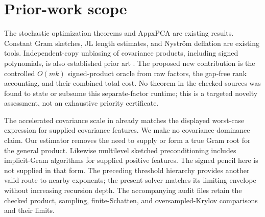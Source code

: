\documentclass[11pt]{article}
\begin{document}
\section{Prior-work scope}
The stochastic optimization theorems \cite{garber,frostig} and
AppxPCA \cite{lazysvd} are existing results. Constant Gram sketches,
JL length estimates, and Nystr\"om deflation are existing tools.
Independent-copy unbiasing of covariance products, including signed
polynomials, is also established prior art \cite{lijordan,gemp}.
The proposed new contribution is the controlled \(O(mk)\)
signed-product oracle from raw factors, the gap-free rank accounting,
and their combined total cost. No theorem in the checked sources was
found to state or subsume this separate-factor runtime; this is a
targeted novelty assessment, not an exhaustive priority certificate.

The accelerated covariance scale in \cite{garber} already matches
the displayed worst-case expression for supplied covariance features.
We make no covariance-dominance claim. Our estimator removes the
need to supply or form a true Gram root for the general product.
Likewise multilevel sketched preconditioning \cite{msp} includes
implicit-Gram algorithms for supplied positive features.
The signed pencil here is not supplied in that form.
The preceding threshold hierarchy \cite{thresholdnote} provides
another valid route to nearby exponents; the present solver matches
its limiting envelope without increasing recursion depth.
The accompanying audit files retain the checked product, sampling,
finite-Schatten, and oversampled-Krylov comparisons and their limits.
\end{document}

